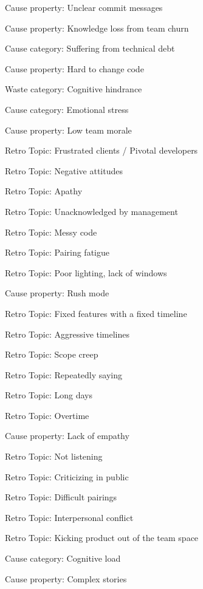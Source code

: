 {{\quad \quad Cause property: Unclear commit messages

\quad \quad Cause property: Knowledge loss from team churn

\quad Cause category: Suffering from technical debt

\quad \quad Cause property: Hard to change code


Waste category: Cognitive hindrance

\quad Cause category: Emotional stress

\quad \quad Cause property: Low team morale

\quad \quad \quad Retro Topic: Frustrated clients / Pivotal developers

\quad \quad \quad Retro Topic: Negative attitudes

\quad \quad \quad Retro Topic: Apathy

\quad \quad \quad Retro Topic: Unacknowledged by management

\quad \quad \quad Retro Topic: Messy code

\quad \quad \quad Retro Topic: Pairing fatigue

\quad \quad \quad Retro Topic: Poor lighting, lack of windows

\quad \quad Cause property: Rush mode

\quad \quad \quad Retro Topic: Fixed features with a fixed timeline

\quad \quad \quad Retro Topic: Aggressive timelines

\quad \quad \quad Retro Topic: Scope creep

\quad \quad \quad Retro Topic: Repeatedly saying 

\quad \quad \quad Retro Topic: Long days

\quad \quad \quad Retro Topic: Overtime

\quad \quad Cause property: Lack of empathy

\quad \quad \quad Retro Topic: Not listening

\quad \quad \quad Retro Topic: Criticizing in public

\quad \quad \quad Retro Topic: Difficult pairings

\quad \quad \quad Retro Topic: Interpersonal conflict

\quad \quad \quad Retro Topic: Kicking product out of the team space

\quad Cause category: Cognitive load

\quad \quad Cause property: Complex stories

}}
